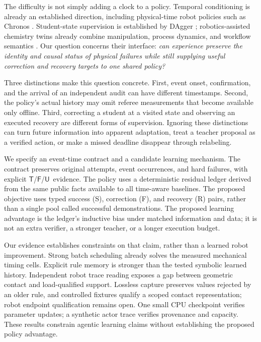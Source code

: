 \documentclass{article}
\newcommand{\True}{\ensuremath{\mathsf{T}}}
\newcommand{\False}{\ensuremath{\mathsf{F}}}
\newcommand{\Unk}{\ensuremath{\mathsf{U}}}
\begin{document}
The difficulty is not simply adding a clock to a policy. Temporal conditioning is already an established direction, including physical-time robot policies such as Chronos \citep{wang2026chronos}. Student-state supervision is established by DAgger \citep{ross2011dagger}; robotics-assisted chemistry twins already combine manipulation, process dynamics, and workflow semantics \citep{darvish2026matterix}. Our question concerns their interface: \emph{can experience preserve the identity and causal status of physical failures while still supplying useful correction and recovery targets to one shared policy?}

Three distinctions make this question concrete. First, event onset, confirmation, and the arrival of an independent audit can have different timestamps. Second, the policy's actual history may omit referee measurements that become available only offline. Third, correcting a student at a visited state and observing an executed recovery are different forms of supervision. Ignoring these distinctions can turn future information into apparent adaptation, treat a teacher proposal as a verified action, or make a missed deadline disappear through relabeling.

We specify an event-time contract and a candidate learning mechanism. The contract preserves original attempts, event occurrences, and hard failures, with explicit \True/\False/\Unk\ evidence. The policy uses a deterministic residual ledger derived from the same public facts available to all time-aware baselines. The proposed objective uses typed success (S), correction (F), and recovery (R) pairs, rather than a single pool called successful demonstrations. The proposed learning advantage is the ledger's inductive bias under matched information and data; it is not an extra verifier, a stronger teacher, or a longer execution budget.

Our evidence establishes constraints on that claim, rather than a learned robot improvement. Strong batch scheduling already solves the measured mechanical timing cells. Explicit rule memory is stronger than the tested symbolic learned history. Independent robot trace reading exposes a gap between geometric contact and load-qualified support. Lossless capture preserves values rejected by an older rule, and controlled fixtures qualify a scoped contact representation; robot endpoint qualification remains open. One small CPU checkpoint verifies parameter updates; a synthetic actor trace verifies provenance and capacity. These results constrain agentic learning claims without establishing the proposed policy advantage.
\end{document}
